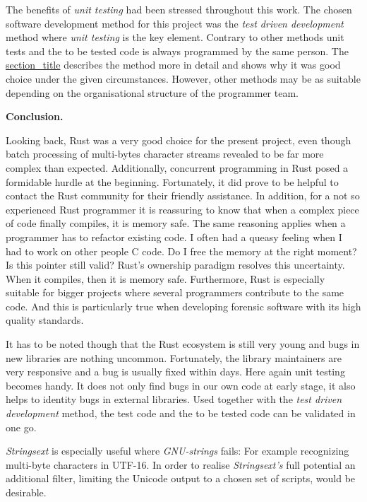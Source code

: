 The benefits of \emph{unit testing} had been stressed throughout this
work. The chosen software development method for this project was the
\emph{test driven development} method where \emph{unit testing} is the
key element. Contrary to other methods unit tests and the to be tested
code is always programmed by the same person. The
\protect\hyperlink{_test_driven_development}{section\_title} describes
the method more in detail and shows why it was good choice under the
given circumstances. However, other methods may be as suitable depending
on the organisational structure of the programmer team.

\textbf{Conclusion.}

Looking back, Rust was a very good choice for the present project, even
though batch processing of multi-bytes character streams revealed to be
far more complex than expected. Additionally, concurrent programming in
Rust posed a formidable hurdle at the beginning. Fortunately, it did
prove to be helpful to contact the Rust community for their friendly
assistance. In addition, for a not so experienced Rust programmer it is
reassuring to know that when a complex piece of code finally compiles,
it is memory safe. The same reasoning applies when a programmer has to
refactor existing code. I often had a queasy feeling when I had to work
on other people C code. Do I free the memory at the right moment? Is
this pointer still valid? Rust's ownership paradigm resolves this
uncertainty. When it compiles, then it is memory safe. Furthermore, Rust
is especially suitable for bigger projects where several programmers
contribute to the same code. And this is particularly true when
developing forensic software with its high quality standards.

It has to be noted though that the Rust ecosystem is still very young
and bugs in new libraries are nothing uncommon. Fortunately, the library
maintainers are very responsive and a bug is usually fixed within days.
Here again unit testing becomes handy. It does not only find bugs in our
own code at early stage, it also helps to identity bugs in external
libraries. Used together with the \emph{test driven development} method,
the test code and the to be tested code can be validated in one go.

\emph{Strings­ext} is especially useful where \emph{GNU-strings} fails:
For example recognizing multi-byte characters in UTF-16. In order to
realise \emph{Strings­ext's} full potential an additional filter,
limiting the Unicode output to a chosen set of scripts, would be
desirable.

